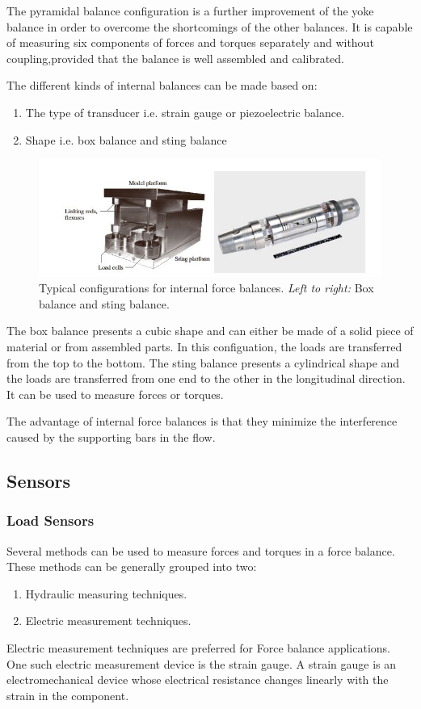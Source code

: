 The pyramidal balance configuration is a further improvement of the yoke balance in order to overcome the shortcomings of the other balances. It is capable of measuring six components of forces and
torques separately and without coupling,provided that the balance is well assembled and calibrated.

The different kinds of internal balances can be made based on:
\begin{enumerate}
\item The type of transducer i.e. strain gauge or piezoelectric balance.
\item Shape i.e. box balance and sting balance
\end{enumerate} 
\begin{center}
	\begin{figure}[!h]
	\centering
	\includegraphics{Figures/Fig7}
	\caption{Typical configurations for internal force balances. \textit{Left to right:} Box balance and sting balance.}
	\end{figure}
\end{center}
The box balance presents a cubic shape and can either be made of a solid piece of material or from assembled parts. In this configuation, the loads are transferred from the top to the bottom. The sting balance presents a cylindrical shape and the loads are transferred from one end to the other in the longitudinal direction. It can be used to measure forces or torques.

The advantage of internal force balances is that they minimize the interference caused by the supporting bars in the flow.
\subsection{Sensors}
\subsubsection{Load Sensors}
Several methods can be used to measure forces and torques in a force balance. These methods can be generally grouped into two:
\begin{enumerate}
\item Hydraulic measuring techniques.
\item Electric measurement techniques.
\end{enumerate}
Electric measurement techniques are preferred for Force balance applications. One such electric measurement device is the strain gauge. A strain gauge is an electromechanical device whose electrical resistance changes linearly with the strain in the component.

